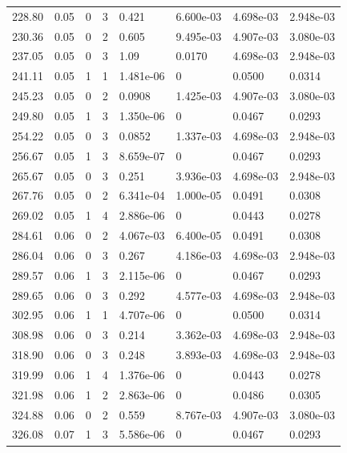 \documentclass[preview]{standalone}
\begin{document}
{{{\begin{tabular}{L{1.2cm}C{1.2cm} C{0.3cm}C{0.5cm} C{1.4cm}C{1.4cm} C{1.4cm}C{1.4cm}}
  228.80  &  0.05  & 0     &  3 &  0.421  & 6.600e-03  & 4.698e-03 &  2.948e-03   \\ 
  230.36  &  0.05  & 0     &  2 &  0.605  & 9.495e-03  & 4.907e-03 &  3.080e-03   \\ 
  237.05  &  0.05  & 0     &  3 &  1.09  & 0.0170  & 4.698e-03 &  2.948e-03   \\ 
  241.11  &  0.05  & 1     &  1 &  1.481e-06  & 0  & 0.0500 &  0.0314   \\ 
  245.23  &  0.05  & 0     &  2 &  0.0908  & 1.425e-03  & 4.907e-03 &  3.080e-03   \\ 
  249.80  &  0.05  & 1     &  3 &  1.350e-06  & 0  & 0.0467 &  0.0293   \\ 
  254.22  &  0.05  & 0     &  3 &  0.0852  & 1.337e-03  & 4.698e-03 &  2.948e-03   \\ 
  256.67  &  0.05  & 1     &  3 &  8.659e-07  & 0  & 0.0467 &  0.0293   \\ 
  265.67  &  0.05  & 0     &  3 &  0.251  & 3.936e-03  & 4.698e-03 &  2.948e-03   \\ 
  267.76  &  0.05  & 0     &  2 &  6.341e-04  & 1.000e-05  & 0.0491 &  0.0308   \\ 
  269.02  &  0.05  & 1     &  4 &  2.886e-06  & 0  & 0.0443 &  0.0278   \\ 
  284.61  &  0.06  & 0     &  2 &  4.067e-03  & 6.400e-05  & 0.0491 &  0.0308   \\ 
  286.04  &  0.06  & 0     &  3 &  0.267  & 4.186e-03  & 4.698e-03 &  2.948e-03   \\ 
  289.57  &  0.06  & 1     &  3 &  2.115e-06  & 0  & 0.0467 &  0.0293   \\ 
  289.65  &  0.06  & 0     &  3 &  0.292  & 4.577e-03  & 4.698e-03 &  2.948e-03   \\ 
  302.95  &  0.06  & 1     &  1 &  4.707e-06  & 0  & 0.0500 &  0.0314   \\ 
  308.98  &  0.06  & 0     &  3 &  0.214  & 3.362e-03  & 4.698e-03 &  2.948e-03   \\ 
  318.90  &  0.06  & 0     &  3 &  0.248  & 3.893e-03  & 4.698e-03 &  2.948e-03   \\ 
  319.99  &  0.06  & 1     &  4 &  1.376e-06  & 0  & 0.0443 &  0.0278   \\ 
  321.98  &  0.06  & 1     &  2 &  2.863e-06  & 0  & 0.0486 &  0.0305   \\ 
  324.88  &  0.06  & 0     &  2 &  0.559  & 8.767e-03  & 4.907e-03 &  3.080e-03   \\ 
  326.08  &  0.07  & 1     &  3 &  5.586e-06  & 0  & 0.0467 &  0.0293   \\ 

\end{tabular}}}}
\end{document}
